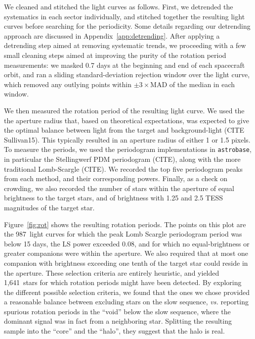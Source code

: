 \documentclass[12pt,twocolumn,tighten]{aastex63}
\newcommand{\nautorotdenominator}{1{,}641\ } %
\newcommand{\nautorotnumerator}{987\ } %
\begin{document}
We cleaned and stitched the light curves as follows.
First, we detrended the systematics in each sector individually, and
stitched together the resulting light curves before searching for the
periodicity.  Some details regarding our detrending approach are
discussed in Appendix~\ref{app:detrending}.  After applying a
detrending step aimed at removing systematic trends, we proceeding
with a few small cleaning steps aimed at improving the purity of the
rotation period measurements: we masked 0.7 days at the beginning and
end of each spacecraft orbit, and ran a sliding standard-deviation
rejection window over the light curve, which removed any outlying
points within $\pm3\times$MAD of the median in each window.

We then measured the rotation period of the resulting light curve.  We
used the the aperture radius that, based on theoretical expectations,
was expected to give the optimal balance between light from the target
and background-light (CITE Sullivan15).  This typically resulted in an
aperture radius of either 1 or 1.5 pixels.  To measure the periods, we
used the periodogram implementations in \texttt{astrobase}, in
particular the Stellingwerf PDM periodogram (CITE), along with the
more traditional Lomb-Scargle (CITE).  We recorded the top five
periodogram peaks from each method, and their corresponding powers.
Finally, as a check on crowding, we also recorded the number of stars
within the aperture of equal brightness to the target stars, and of
brightness with 1.25 and 2.5 TESS magnitudes of the target star.

Figure~\ref{fig:rot} shows the resulting rotation periods.  The points
on this plot are the \nautorotnumerator light curves for which the peak Lomb Scargle
periodogram period was below 15 days, the LS power exceeded 0.08, and
for which no equal-brightness or greater companions were within the aperture. 
We also required that at most one companion with brightness exceeding 
one tenth of the target star could reside in the aperture.
These
selection criteria are entirely heuristic, and yielded
\nautorotdenominator stars for which rotation periods might have been
detected.  
By exploring the different possible selection criteria, we found that
the ones we chose provided a
reasonable balance between excluding stars on the slow sequence, {\it
vs.} reporting spurious rotation periods in the ``void'' below the
slow sequence, where the dominant signal was in fact from a
neighboring star.
Splitting the resulting sample into the ``core'' and the ``halo'', they
suggest that the halo is real.
\end{document}

